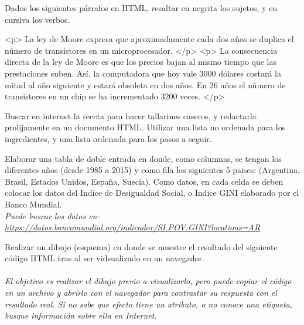 \documentclass[12pt, addpoints]{../../common/epyl_exam_template}
\begin{document}
\begin{questions}
\begin{parts}
\end{parts}

  \question
    Dados los siguientes párrafos en HTML, resaltar en negrita los sujetos, y en
    cursiva los verbos.
    \begin{quoted}
      <p>
        La ley de Moore expresa que aproximadamente cada dos años se duplica el
        número de transistores en un microprocesador.
      </p>
      <p>
        La consecuencia directa de la ley de Moore es que los precios bajan al
        mismo tiempo que las prestaciones suben. Así, la computadora que hoy
        vale 3000 dólares costará la mitad al año siguiente y estará obsoleta en
        dos años. En 26 años el número de transistores en un chip se ha
        incrementado 3200 veces.
      </p>
    \end{quoted}

  \question
    Buscar en internet la receta para hacer tallarines caseros, y redactarla
    prolijamente en un documento HTML. Utilizar una lista no ordenada para
    los ingredientes, y una lista ordenada para los pasos a seguir.

  \question
    Elaborar una tabla de doble entrada en donde, como columnas, se tengan los
    diferentes años (desde 1985 a 2015) y como fila los siguientes 5 paises:
    (Argentina, Brasil, Estados Unidos, España, Suecia). Como datos, en cada
    celda se deben colocar los datos del Indice de Desigualdad Social, o Indice
    GINI elaborado por el Banco Mundial.
    \\
    \textit{Puede buscar los datos en:\\
      \hyperref[https://datos.bancomundial.org/indicador/SI.POV.GINI?locations=AR]
      {https://datos.bancomundial.org/indicador/SI.POV.GINI?locations=AR}
    }

  \question
    Realizar un dibujo (esquema) en donde se muestre el resultado del
    siguiente código HTML tras al ser vidsualizado en un navegador.\\~\\
    \textit{El objetivo es realizar el dibujo previo a visualizarlo, pero
    puede copiar el código en un archivo y abrirlo con el navegador para
    contrastar su respuesta con el resultado real. Si no sabe que efecto
    tiene un atributo, o no conoce una etiqueta, busque información sobre
    ella en Internet}.


\end{questions}
\end{document}
